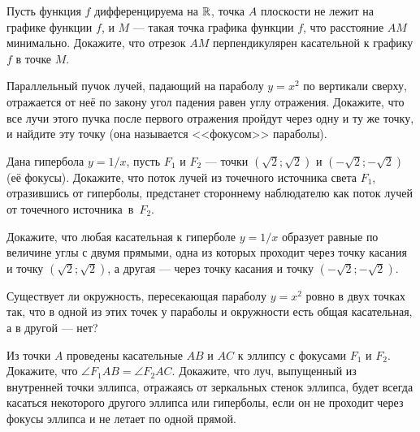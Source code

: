 \documentclass[a4paper, 12pt]{article}
\begin{document}
 Пусть функция $f$ дифференцируема на $\mathbb{R}$, точка $A$ плоскости
не лежит на графике функции $f$, и $M$ --- такая точка графика
функции $f$, что расстояние $AM$ минимально. Докажите, что отрезок
$AM$ перпендикулярен касательной к графику $f$ в точке $M$.

Параллельный пучок лучей, падающий на параболу $y=x^2$ по
вертикали сверху, отражается от не\"е по закону
 угол падения равен углу отражения.
Докажите, что все лучи этого пучка после первого отражения
пройдут через одну и ту же точку, и найдите эту точку (она называется <<фокусом>> параболы).


Дана гипербола $y=1/x$, пусть $F_1$ и $F_2$ --- точки $(\sqrt2;\sqrt2)$ и $(-\sqrt2;-\sqrt2)$ (её фокусы).
Докажите, что поток лучей из точечного источника света $F_1$, отразившись от гиперболы,
предстанет стороннему наблюдателю как поток лучей от точечного источника~в~$F_2$.

Докажите, что любая касательная к гиперболе $y=1/x$ образует равные
по величине углы с двумя прямыми, одна из которых проходит через
точку касания и точку $(\sqrt2;\sqrt2)$, а другая ---  через
точку касания и точку $(-\sqrt2;-\sqrt2)$.



Существует ли окружность, %
пересекающая параболу $y=x^2$ ровно в двух точках так,
что в одной из этих точек у параболы и окружности есть общая
касательная, а в другой --- нет?


 Из точки $A$ проведены касательные $AB$ и $AC$ к эллипсу с фокусами $F_1$ и $F_2$. Докажите, что $\angle F_1AB=\angle F_2AC.$
 Докажите, что луч, выпущенный из внутренней точки эллипса, отражаясь от зеркальных стенок эллипса, будет всегда касаться некоторого другого эллипса или гиперболы, если он не проходит через фокусы эллипса и не летает по одной прямой.



\end{document}
